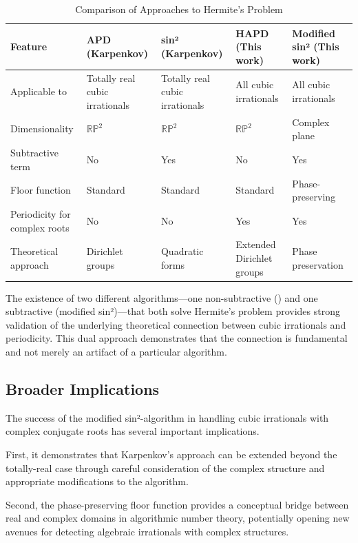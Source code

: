 \begin{table}[h]
\centering
\caption{Comparison of Approaches to Hermite's Problem}
\label{tab:algorithm_comparison_extended}
\small
\begin{tabular}{|p{}|p{}|p{}|p{}|p{}|}
\hline
\textbf{Feature} & \textbf{APD (Karpenkov)} & \textbf{sin² (Karpenkov)} & \textbf{HAPD (This work)} & \textbf{Modified sin² (This work)} \\
\hline
Applicable to & Totally real cubic irrationals & Totally real cubic irrationals & All cubic irrationals & All cubic irrationals \\
\hline
Dimensionality & $\mathbb{RP}^2$ & $\mathbb{RP}^2$ & $\mathbb{RP}^2$ & Complex plane \\
\hline
Subtractive term & No & Yes & No & Yes \\
\hline
Floor function & Standard & Standard & Standard & Phase-preserving \\
\hline
Periodicity for complex roots & No & No & Yes & Yes \\
\hline
Theoretical approach & Dirichlet groups & Quadratic forms & Extended Dirichlet groups & Phase preservation \\
\hline
\end{tabular}
\end{table}

The existence of two different algorithms—one non-subtractive (\HAPD{}) and one subtractive (modified sin²)—that both solve Hermite's problem provides strong validation of the underlying theoretical connection between cubic irrationals and periodicity. This dual approach demonstrates that the connection is fundamental and not merely an artifact of a particular algorithm.

\subsection{Broader Implications}

The success of the modified sin²-algorithm in handling cubic irrationals with complex conjugate roots has several important implications.

First, it demonstrates that Karpenkov's approach can be extended beyond the totally-real case through careful consideration of the complex structure and appropriate modifications to the algorithm.

Second, the phase-preserving floor function provides a conceptual bridge between real and complex domains in algorithmic number theory, potentially opening new avenues for detecting algebraic irrationals with complex structures.

